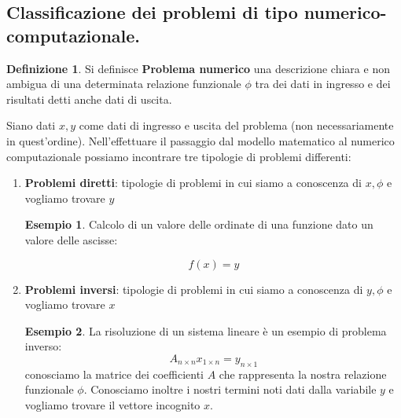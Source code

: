 \documentclass[12pt, a4paper]{book}
\theoremstyle{definition}
\newtheorem{exmp}{Esempio}[section]
\newtheorem{defn}{Definizione}[section]
\begin{document}
\subsection{Classificazione dei problemi di tipo numerico-computazionale.}
\begin{flushleft}

\begin{defn}
	Si definisce \textbf{Problema numerico} una descrizione chiara e non ambigua di una determinata relazione funzionale $\phi$ tra dei dati in ingresso e dei risultati detti anche dati di uscita. 
\end{defn}
\vspace{1cm}

Siano dati $x,y$ come dati di ingresso e uscita del problema (non necessariamente in quest'ordine).
Nell'effettuare il passaggio dal modello matematico al numerico computazionale possiamo incontrare tre tipologie di problemi differenti: 

\begin{enumerate}
	\item \textbf{Problemi diretti}: tipologie di problemi in cui siamo a conoscenza di $x, \phi$ e vogliamo trovare $y$
\begin{exmp}

Calcolo di un valore delle ordinate di una funzione dato un valore delle ascisse:

\[
	f(x) = y
\]
\end{exmp}
\item \textbf{Problemi inversi}: tipologie di problemi in cui siamo a conoscenza di $y, \phi$ e vogliamo trovare $x$
\begin{exmp}
La risoluzione di un sistema lineare è un esempio di problema inverso: 
\[ 
	A_{n \times n} x_{1 \times n} = y_{n \times 1}
\]
conosciamo la matrice dei coefficienti $A$ che rappresenta la nostra relazione funzionale $\phi$.  Conosciamo inoltre i nostri termini noti dati dalla variabile $y$ e vogliamo trovare il vettore incognito $x$.
\end{exmp}


\end{enumerate}
\end{flushleft}
\end{document}
